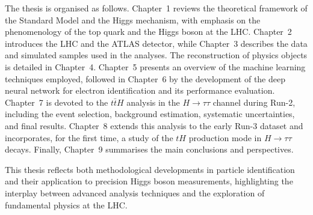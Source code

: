 The thesis is organised as follows. Chapter~1 reviews the theoretical framework of the Standard Model and the Higgs mechanism, with emphasis on the phenomenology of the top quark and the Higgs boson at the LHC. Chapter~2 introduces the LHC and the ATLAS detector, while Chapter~3 describes the data and simulated samples used in the analyses. The reconstruction of physics objects is detailed in Chapter~4. Chapter~5 presents an overview of the machine learning techniques employed, followed in Chapter~6 by the development of the deep neural network for electron identification and its performance evaluation. Chapter~7 is devoted to the $t\bar{t}H$ analysis in the $H\to\tau\tau$ channel during Run-2, including the event selection, background estimation, systematic uncertainties, and final results. Chapter~8 extends this analysis to the early Run-3 dataset and incorporates, for the first time, a study of the $tH$ production mode in $H \to \tau\tau$ decays. Finally, Chapter~9 summarises the main conclusions and perspectives.

This thesis reflects both methodological developments in particle identification and their application to precision Higgs boson measurements, highlighting the interplay between advanced analysis techniques and the exploration of fundamental physics at the LHC.

